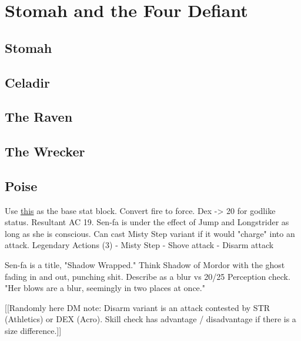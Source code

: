 \section{Stomah and the Four Defiant}\label{sec:celadir}
\subsection{Stomah}

\subsection{Celadir}

\subsection{The Raven}


\subsection{The Wrecker}

\subsection{Poise}

Use \href{https://i.imgur.com/HIvPzSj.jpg}{this} as the base stat block.
Convert fire to force.
Dex -> 20 for godlike status.
Resultant AC 19.
Sen-fa is under the effect of Jump and Longstrider as long as she is conscious.
Can cast Misty Step variant if it would "charge" into an attack.
Legendary Actions (3)
- Misty Step
- Shove attack
- Disarm attack

Sen-fa is a title, "Shadow Wrapped."
Think Shadow of Mordor with the ghost fading in and out, punching shit.
Describe as a blur vs 20/25 Perception check.
"Her blows are a blur, seemingly in two places at once."

[[Randomly here DM note:
Disarm variant is an attack contested by STR (Athletics) or DEX (Acro).
Skill check has advantage / disadvantage if there is a size difference.]]


